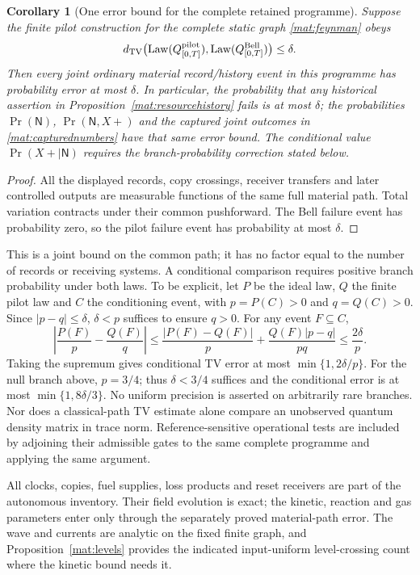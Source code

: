 \documentclass[11pt]{article}
\newtheorem{corollary}[theorem]{Corollary}
\theoremstyle{definition}\newtheorem{definition}[theorem]{Definition}
\theoremstyle{remark}\newtheorem{remark}[theorem]{Remark}
\newcommand{\Law}{\operatorname{Law}}\newcommand{\TV}{d_{\mathrm{TV}}}
\begin{document}
\begin{corollary}[One error bound for the complete retained programme]
\label{mat:transfer}
Suppose the finite pilot construction for the complete static graph
\eqref{mat:feynman} obeys
\[
 \TV\bigl(\Law(Q^{\rm pilot}_{[0,T]}),
            \Law(Q^{\rm Bell}_{[0,T]})\bigr)\le\delta.
\]
Then every joint ordinary material record/history event in this
programme has probability error at most $\delta$.  In particular,
the probability that any historical assertion in
Proposition~\ref{mat:resourcehistory} fails is at most $\delta$;
the probabilities $\Pr(\mathsf N)$, $\Pr(\mathsf N,X+)$ and the captured joint outcomes
in \eqref{mat:capturednumbers} have that same error bound.  The
conditional value $\Pr(X+\mid\mathsf N)$ requires the branch-probability
correction stated below.
\end{corollary}
\begin{proof}
All the displayed records, copy crossings, receiver transfers and
later controlled outputs are measurable functions of the same full
material path.  Total variation contracts under their common
pushforward.  The Bell failure event has probability zero, so the
pilot failure event has probability at most $\delta$.
\end{proof}
This is a joint bound on the common path; it has no factor equal to
the number of records or receiving systems.  A conditional comparison
requires positive branch probability under both laws.  To be explicit,
let $P$ be the ideal law, $Q$ the finite pilot law and $C$ the conditioning
event, with $p=P(C)>0$ and $q=Q(C)>0$.  Since $|p-q|\le\delta$,
$\delta<p$ suffices to ensure $q>0$.  For any event $F\subseteq C$,
\[
 \left|\frac{P(F)}p-\frac{Q(F)}q\right|
 \le\frac{|P(F)-Q(F)|}{p}+\frac{Q(F)|p-q|}{pq}
 \le\frac{2\delta}{p}.
\]
Taking the supremum gives conditional TV error at most
$\min\{1,2\delta/p\}$.  For the null branch above, $p=3/4$;
thus $\delta<3/4$ suffices and the conditional error is at most
$\min\{1,8\delta/3\}$.  No uniform precision is asserted on
arbitrarily rare branches.  Nor does a classical-path TV estimate alone compare an
unobserved quantum density matrix in trace norm.  Reference-sensitive
operational tests are included by adjoining their admissible gates
to the same complete programme and applying the same argument.

All clocks, copies, fuel supplies, loss products and reset receivers
are part of the autonomous inventory.  Their field evolution is
exact; the kinetic, reaction and gas parameters enter only through
the separately proved material-path error.  The wave and currents
are analytic on the fixed finite graph, and
Proposition~\ref{mat:levels} provides the indicated input-uniform
level-crossing count where the kinetic bound needs it.
\end{document}
